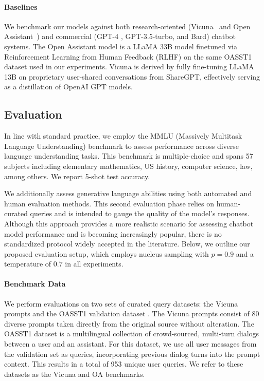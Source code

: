 \paragraph{Baselines} We benchmark our models against both research-oriented (Vicuna~\citep{vicuna2023} and Open Assistant~\citep{kopf2023openassistant}) and commercial (GPT-4 \citep{openai2023gpt}, GPT-3.5-turbo, and Bard) chatbot systems. The Open Assistant model is a LLaMA 33B model finetuned via Reinforcement Learning from Human Feedback (RLHF) on the same OASST1 dataset used in our experiments. Vicuna is derived by fully fine-tuning LLaMA 13B on proprietary user-shared conversations from ShareGPT, effectively serving as a distillation of OpenAI GPT models.

\subsection{Evaluation}

In line with standard practice, we employ the MMLU (Massively Multitask Language Understanding) benchmark \citep{hendrycksmeasuring} to assess performance across diverse language understanding tasks. This benchmark is multiple-choice and spans 57 subjects including elementary mathematics, US history, computer science, law, among others. We report 5-shot test accuracy.

We additionally assess generative language abilities using both automated and human evaluation methods. This second evaluation phase relies on human-curated queries and is intended to gauge the quality of the model’s responses. Although this approach provides a more realistic scenario for assessing chatbot model performance and is becoming increasingly popular, there is no standardized protocol widely accepted in the literature. Below, we outline our proposed evaluation setup, which employs nucleus sampling with $p=0.9$ and a temperature of $0.7$ in all experiments.

\paragraph{Benchmark Data} We perform evaluations on two sets of curated query datasets: the Vicuna prompts \citep{vicuna2023} and the OASST1 validation dataset \citep{kopf2023openassistant}. The Vicuna prompts consist of 80 diverse prompts taken directly from the original source without alteration. The OASST1 dataset is a multilingual collection of crowd-sourced, multi-turn dialogs between a user and an assistant. For this dataset, we use all user messages from the validation set as queries, incorporating previous dialog turns into the prompt context. This results in a total of 953 unique user queries. We refer to these datasets as the Vicuna and OA benchmarks.

